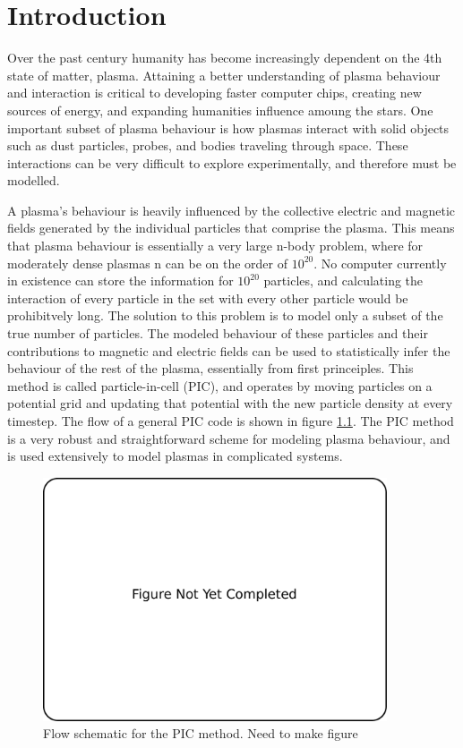 
\chapter{Introduction}
	Over the past century humanity has become increasingly dependent on the 4th state of matter, plasma. Attaining a better understanding of plasma behaviour and interaction is critical to developing faster computer chips, creating new sources of energy, and expanding humanities influence amoung the stars. One important subset of plasma behaviour is how plasmas interact with solid objects such as dust particles, probes, and bodies traveling through space. These interactions can be very difficult to explore experimentally, and therefore must be modelled. 
	
A plasma's behaviour is heavily influenced by the collective electric and magnetic fields generated by the individual particles that comprise the plasma. This means that plasma behaviour is essentially a very large n-body problem, where for moderately dense plasmas n can be on the order of $10^{20}$. No computer currently in existence can store the information for $10^{20}$ particles, and calculating the interaction of every particle in the set with every other particle would be prohibitvely long. The solution to this problem is to model only a subset of the true number of particles. The modeled behaviour of these particles and their contributions to magnetic and electric fields can be used to statistically infer the behaviour of the rest of the plasma, essentially from first princeiples. This method is called particle-in-cell (PIC), and operates by moving particles on a potential grid and updating that potential with the new particle density at every timestep. The flow of a general PIC code is shown in figure \ref{fig:pic_flowchart}. The PIC method is a very robust and straightforward scheme for modeling plasma behaviour, and is used extensively to model plasmas in complicated systems.

\begin{figure}
\begin{center}
\includegraphics[width=4in]{introduction/not_finished.pdf}
\end{center}
\caption{Flow schematic for the PIC method. Need to make figure}
\label{fig:pic_flowchart}
\end{figure}


